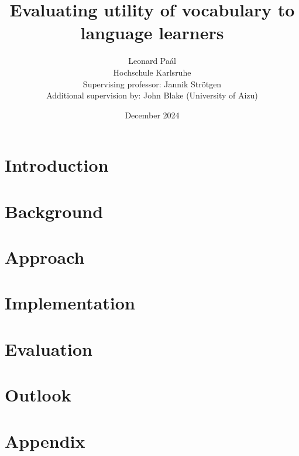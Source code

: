 \documentclass[12pt]{report}
\title{Evaluating utility of vocabulary to language learners}
\author{Leonard Paál\\Hochschule Karlsruhe\\Supervising professor: Jannik Strötgen\\Additional supervision by: John Blake (University of Aizu)}
\date{December 2024}
\begin{document}
\maketitle
\begin{abstract}
	\noindent [Abstract]
\end{abstract}

\clearpage
\tableofcontents
\listoffigures
\listoftables
\clearpage

\chapter{Introduction}

\chapter{Background}

\chapter{Approach}

\chapter{Implementation}

\chapter{Evaluation}

\chapter{Outlook}


\chapter{Appendix}




\end{document}

